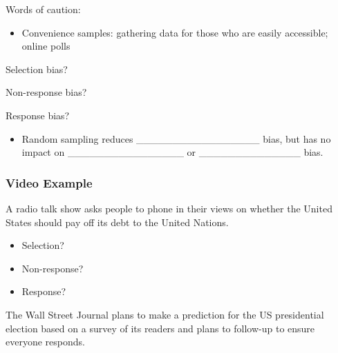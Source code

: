\documentclass[
]{report}
\providecommand{\tightlist}{%
  \setlength{\itemsep}{0pt}\setlength{\parskip}{0pt}}
\newcommand{\rgi}{\hspace{24pt}}  %
\begin{document}
Words of caution:

\begin{itemize}
\tightlist
\item
  Convenience samples: gathering data for those who are easily
  accessible; online polls
\end{itemize}


\rgi \rgi Selection bias?

\rgi \rgi Non-response bias?

\rgi \rgi Response bias?

\begin{itemize}
\tightlist
\item
  Random sampling reduces \_\_\_\_\_\_\_\_\_\_\_\_\_\_\_\_\_ bias, but
  has no impact on \_\_\_\_\_\_\_\_\_\_\_\_\_\_\_\_ or \_\_\_\_\_\_\_\_\_\_\_\_\_\_ bias.
\end{itemize}


\newpage

\subsubsection*{Video Example}\label{video-example}

A radio talk show asks people to phone in their views on whether the United States should pay off its debt to the United Nations.

\begin{itemize}
\tightlist
\item
  Selection?
\end{itemize}

\vspace{0.25in}

\begin{itemize}
\tightlist
\item
  Non-response?
\end{itemize}

\vspace{0.25in}

\begin{itemize}
\tightlist
\item
  Response?
\end{itemize}

\vspace{0.25in}

The Wall Street Journal plans to make a prediction for the US presidential election based on a survey of its readers and plans to follow-up to ensure everyone responds.
\end{document}
